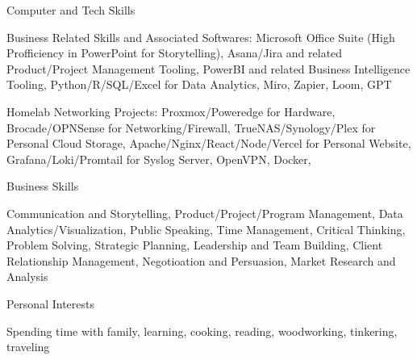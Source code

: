 

\begin{cventries}

  \cventry
    {Computer and Tech Skills} %
    {} %
    {} %
    {} %
    {
      \begin{cvitems} %
        \item {Business Related Skills and Associated Softwares: Microsoft Office Suite (High Profficiency in PowerPoint for Storytelling), Asana/Jira and related Product/Project Management Tooling, PowerBI and related Business Intelligence Tooling, Python/R/SQL/Excel for Data Analytics, Miro, Zapier, Loom, GPT}
        \item {Homelab Networking Projects: Proxmox/Poweredge for Hardware, Brocade/OPNSense for Networking/Firewall, TrueNAS/Synology/Plex for Personal Cloud Storage, Apache/Nginx/React/Node/Vercel for Personal Website, Grafana/Loki/Promtail for Syslog Server, OpenVPN, Docker, }
      \end{cvitems}
    }

  \cventry
    {Business Skills} %
    {} %
    {} %
    {} %
    {
      \begin{cvitems} %
        \item {Communication and Storytelling, Product/Project/Program Management, Data Analytics/Visualization, Public Speaking, Time Management, Critical Thinking, Problem Solving, Strategic Planning, Leadership and Team Building, Client Relationship Management, Negotioation and Persuasion, Market Research and Analysis}
      \end{cvitems}
    }

  \cventry
    {Personal Interests} %
    {} %
    {} %
    {} %
    {
      \begin{cvitems} %
        \item {Spending time with family, learning, cooking, reading, woodworking, tinkering, traveling}
      \end{cvitems}
    }

\end{cventries}
